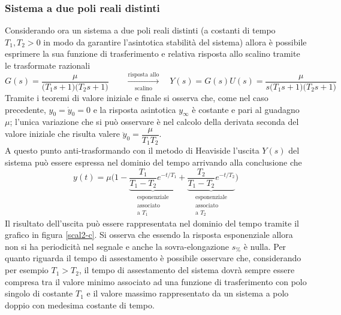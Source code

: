 		\subsubsection{Sistema a due poli reali distinti}
			Considerando ora un sistema a due poli reali distinti (a costanti di tempo $T_1,T_2>0$ in modo da garantire l'asintotica stabilità del sistema) allora è possibile esprimere la sua funzione di trasferimento e relativa risposta allo scalino tramite le trasformate razionali
			\[ G(s) =  \frac \mu{\big(T_1s + 1\big) \big(T_2s + 1\big) } \qquad \xrightarrow[\textrm{scalino}]{\textrm{risposta allo}} \quad Y(s) = G(s) U(s) = \frac \mu{s\big(T_1s + 1\big) \big(T_2s + 1\big) } \]
			Tramite i teoremi di valore iniziale e finale si osserva che, come nel caso precedente, $y_0 = \dot y_0 = 0$ e la risposta asintotica $y_\infty$ è costante e pari al guadagno $\mu$; l'unica variazione che si può osservare è nel calcolo della derivata seconda del valore iniziale che risulta valere $\ddot y_0 = \dfrac \mu {T_1T_2}$. \\
			A questo punto anti-trasformando con il metodo di Heaviside l'uscita $Y(s)$ del sistema può essere espressa nel dominio del tempo arrivando alla conclusione che
			\[ y(t) = \mu \Big(  1 - \underbrace{\frac{T_1}{T_1-T_2} e^{-t/T_1}}_{\substack{\textrm{esponenziale} \\ \textrm{associato} \\ \textrm{a $T_1$}}} + \underbrace{\frac{T_2}{T_1-T_2} e^{-t/T_2} }_{\substack{\textrm{esponenziale} \\ \textrm{associato} \\ \textrm{a $T_2$}}} \Big) \]
			Il risultato dell'uscita può essere rappresentata nel dominio del tempo tramite il grafico in figura \ref{scal2-c}. Si osserva che essendo la risposta esponenziale allora non si ha periodicità nel segnale e anche la sovra-elongazione $s_\%$ è nulla. Per quanto riguarda il tempo di assestamento è possibile osservare che, considerando per esempio $T_1>T_2$, il tempo di assestamento del sistema dovrà sempre essere compresa tra il valore minimo associato ad una funzione di trasferimento con polo singolo di costante $T_1$ e il valore massimo rappresentato da un sistema a polo doppio con medesima costante di tempo.
						
			
